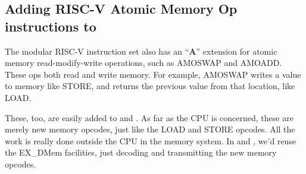 
\subsection{Adding RISC-V Atomic Memory Op instructions to {\DRUM}}


The modular RISC-V instruction set also has an ``{\bf A}'' extension
for atomic memory read-modify-write operations, such as AMOSWAP and
AMOADD.  These ops both read and write memory.  For example, AMOSWAP
writes a value to memory like STORE, and returns the previous value
from that location, like LOAD.

These, too, are easily added to {\DRUM} and {\FIFE}.  As far as the CPU is
concerned, these are merely new memory opcodes, just like the LOAD and
STORE opcodes.  All the work is really done outside the CPU in the
memory system.  In {\DRUM} and {\FIFE}, we'd reuse the EX\_DMem facilities,
just decoding and transmitting the new memory opcodes.

